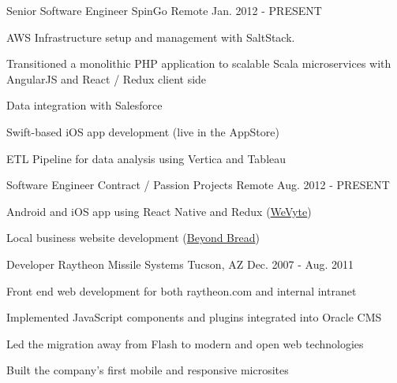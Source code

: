 
\begin{cventries}

  \cventry
    {Senior Software Engineer} %
    {SpinGo} %
    {Remote} %
    {Jan. 2012 - PRESENT} %
    {
      \begin{cvitems} %
        \item {AWS Infrastructure setup and management with SaltStack.}
        \item {Transitioned a monolithic PHP application to scalable Scala microservices with AngularJS and React / Redux client side}
        \item {Data integration with Salesforce}
        \item {Swift-based iOS app development (live in the AppStore)}
        \item {ETL Pipeline for data analysis using Vertica and Tableau}
      \end{cvitems}
    }

  \cventry
    {Software Engineer} %
    {Contract / Passion Projects} %
    {Remote} %
    {Aug. 2012 - PRESENT} %
    {
      \begin{cvitems} %
        \item {Android and iOS app using React Native and Redux (\href{http://wevyte.com}{WeVyte})}
        \item {Local business website development (\href{http://beyondbread.com}{Beyond Bread})}
      \end{cvitems}
    }


  \cventry
    {Developer} %
    {Raytheon Missile Systems} %
    {Tucson, AZ} %
    {Dec. 2007 - Aug. 2011} %
    {
      \begin{cvitems} %
        \item {Front end web development for both raytheon.com and internal intranet}
        \item {Implemented JavaScript components and plugins integrated into Oracle CMS}
        \item {Led the migration away from Flash to modern and open web technologies}
        \item {Built the company’s first mobile and responsive microsites}
      \end{cvitems}
    }


\end{cventries}
